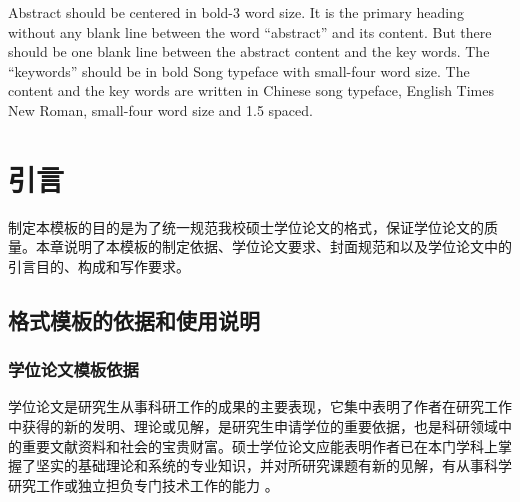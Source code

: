 \documentclass{cqupt_thesis}
\begin{document}
\begin{enabstract}
        Abstract should be centered in bold-3 word size. It is the primary heading without any blank line between the word “abstract” and its content. But there should be one blank line between the abstract content and the key words. The “keywords” should be in bold Song typeface with small-four word size. The content and the key words are written in Chinese song typeface, English Times New Roman, small-four word size and 1.5 spaced.

    \end{enabstract}





    \initmaincontent %


    \chapter{引言}

    制定本模板的目的是为了统一规范我校硕士学位论文的格式，保证学位论文的质量。本章说明了本模板的制定依据、学位论文要求、封面规范和以及学位论文中的引言目的、构成和写作要求。


    \section{格式模板的依据和使用说明}

    \subsection{学位论文模板依据}

    学位论文是研究生从事科研工作的成果的主要表现，它集中表明了作者在研究工作中获得的新的发明、理论或见解，是研究生申请学位的重要依据，也是科研领域中的重要文献资料和社会的宝贵财富。硕士学位论文应能表明作者已在本门学科上掌握了坚实的基础理论和系统的专业知识，并对所研究课题有新的见解，有从事科学研究工作或独立担负专门技术工作的能力 。
\end{document}
